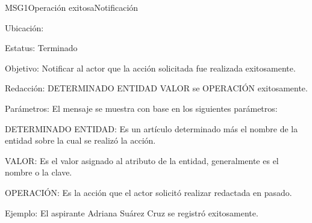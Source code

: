 \begin{mensaje}{MSG1}{Operación exitosa}{Notificación}
	\item[Ubicación:] \msjSuperior
	\item[Estatus:] Terminado
	\item[Objetivo:] Notificar al actor que la acción solicitada fue realizada exitosamente.
	\item[Redacción:] DETERMINADO ENTIDAD VALOR se OPERACIÓN exitosamente.
	\item[Parámetros:] El mensaje se muestra con base en los siguientes parámetros:
	\begin{Citemize} 
		\item DETERMINADO ENTIDAD: Es un artículo determinado más el nombre de la entidad sobre la cual se realizó la acción.
		\item VALOR: Es el valor asignado al atributo de la entidad, generalmente es el nombre o la clave.
		\item OPERACIÓN: Es la acción que el actor solicitó realizar redactada en pasado.
	\end{Citemize}
	\item[Ejemplo:] El aspirante Adriana Suárez Cruz se registró exitosamente.


\end{mensaje}
